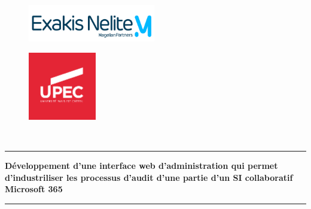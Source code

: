 \begin{titlepage}
    \begin{center}
        \begin{figure}[!h]
            \vspace{- 2 cm}
            \hspace{ 0 cm}
            \includegraphics[width=15em]{images/exakislogo.png}
        \end{figure}
        \begin{figure}[!h]
            \vspace{- 3.34cm}
            \hspace{15cm}
            \includegraphics[width=8em]{images/upecred.png}
        \end{figure}
    \end{center}

    \begin{center}
        \begin{center}
            \noindent {}\\
        \end{center}
        \begin{center}
            \rule{0.9\linewidth}{1pt}
        \end{center}
        \vspace*{0.2cm}
        \noindent \hspace{ 0.3 cm }\Huge \textbf{Développement d'une interface web d'administration qui permet d'industriliser les processus d'audit d'une partie d'un SI collaboratif Microsoft 365}
        \begin{center}
            \rule{0.9\linewidth}{1pt}
        \end{center}


\end{center}
\end{titlepage}
